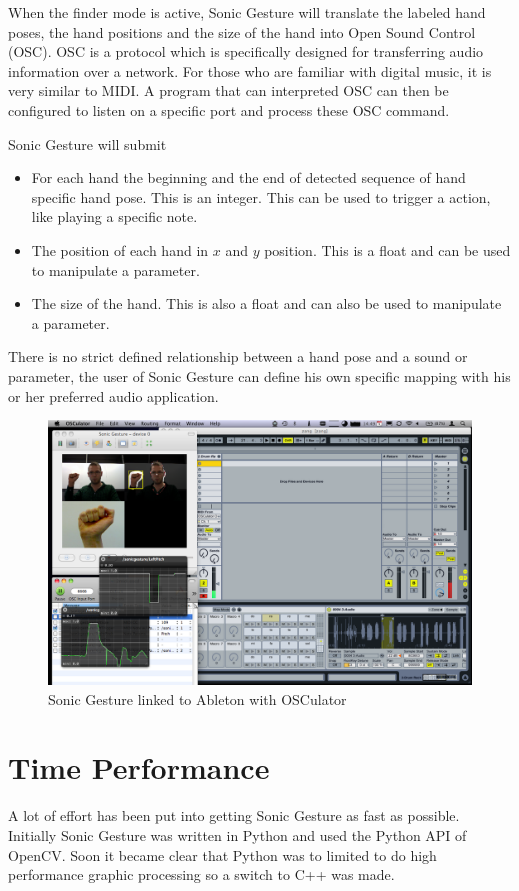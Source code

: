 When the finder mode is active, Sonic Gesture will translate the labeled hand poses, the hand positions and the size of the hand into Open Sound Control (OSC). OSC is a protocol which is specifically designed for transferring audio information over a network. For those who are familiar with digital music, it is very similar to MIDI. A program that can interpreted OSC can then be configured to listen on a specific port and process these OSC command.

Sonic Gesture will submit
\begin{itemize}
	\item For each hand the beginning and the end of detected sequence of hand specific hand pose. This is an integer. This can be used to trigger a action, like playing a specific note.
	\item The position of each hand in $x$ and $y$ position. This is a float and can be used to manipulate a parameter.
	\item The size of the hand. This is also a float and can also be used to manipulate a parameter.
\end{itemize}

There is no strict defined relationship between a hand pose and a sound or parameter, the user of Sonic Gesture can define his own specific mapping with his or her preferred audio application. 

\begin{figure}[ht]
\centering{}
\includegraphics[width=0.9\linewidth]{figures/sonicableton.png}
\caption{Sonic Gesture linked to Ableton with OSCulator}
\label{fig:sonicableton}
\end{figure}

\section{Time Performance}
A lot of effort has been put into getting Sonic Gesture as fast as possible. Initially Sonic Gesture was written in Python and used the Python API of OpenCV. Soon it became clear that Python was to limited to do high performance graphic processing so a switch to C++ was made. 

